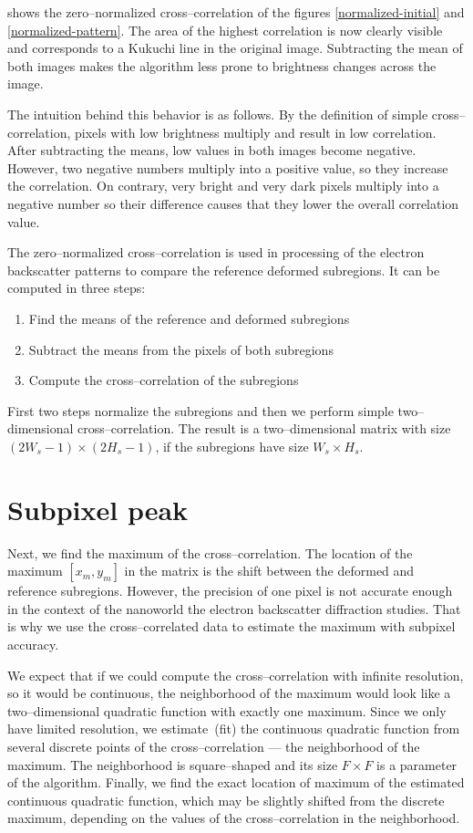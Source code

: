  shows the zero--normalized cross--correlation of the figures \ref{normalized-initial} and \ref{normalized-pattern}. The area of the highest correlation is now clearly visible and corresponds to a Kukuchi line in the original image. Subtracting the mean of both images makes the algorithm less prone to brightness changes across the image.

The intuition behind this behavior is as follows. By the definition of simple cross--correlation, pixels with low brightness multiply and result in low correlation. After subtracting the means, low values in both images become negative. However, two negative numbers multiply into a positive value, so they increase the correlation. On contrary, very bright and very dark pixels multiply into a negative number so their difference causes that they lower the overall correlation value.

The zero--normalized cross--correlation is used in processing of the electron backscatter patterns to compare the reference deformed subregions. It can be computed in three steps:
\begin{enumerate}
	\item Find the means of the reference and deformed subregions
	\item Subtract the means from the pixels of both subregions
	\item Compute the cross--correlation of the subregions
\end{enumerate}
First two steps normalize the subregions and then we perform simple two--dimensional cross--correlation. The result is a two--dimensional matrix with size $(2W_s-1) \times (2H_s-1)$, if the subregions have size $W_s \times H_s$.


\section{Subpixel peak}
\label{subpixel-peak}
Next, we find the maximum of the cross--correlation. The location of the maximum $[x_m,y_m]$ in the matrix is the shift between the deformed and reference subregions. However, the precision of one pixel is not accurate enough in the context of the nanoworld the electron backscatter diffraction studies. That is why we use the cross--correlated data to estimate the maximum with subpixel accuracy.

We expect that if we could compute the cross--correlation with infinite resolution, so it would be continuous, the neighborhood of the maximum would look like a two--dimensional quadratic function with exactly one maximum. Since we only have limited resolution, we estimate~(fit) the continuous quadratic function from several discrete points of the cross--correlation --- the neighborhood of the maximum. The neighborhood is square--shaped and its size $F \times F$ is a parameter of the algorithm. Finally, we find the exact location of maximum of the estimated continuous quadratic function, which may be slightly shifted from the discrete maximum, depending on the values of the cross--correlation in the neighborhood.


